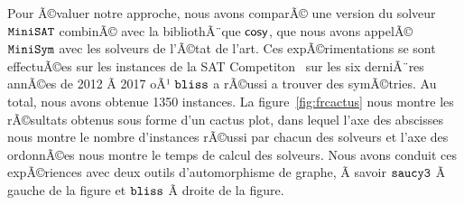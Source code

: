 Pour Ã©valuer notre approche, nous avons comparÃ© une version du solveur $\texttt{MiniSAT}$ combinÃ© avec la bibliothÃ¨que $\textsf{cosy}$, que nous avons appelÃ© $\texttt{MiniSym}$ avec les solveurs de l'Ã©tat de l'art.
Ces expÃ©rimentations se sont effectuÃ©es sur les instances de la SAT Competiton~\cite{jarvisalo2012international} sur les six derniÃ¨res annÃ©es de 2012 Ã  2017 oÃ¹ $\texttt{bliss}$ a rÃ©ussi a trouver des symÃ©tries. Au total, nous avons obtenue 1350 instances.
La figure~\ref{fig:frcactus} nous montre les rÃ©sultats obtenus sous forme d'un cactus plot, 
dans lequel l'axe des abscisses nous montre le nombre d'instances rÃ©ussi par chacun des solveurs et l'axe des ordonnÃ©es nous montre le temps de calcul des solveurs.
Nous avons conduit ces expÃ©riences avec deux outils d'automorphisme de graphe, Ã  savoir 
 $\texttt{saucy3}$ Ã  gauche de la figure et $\texttt{bliss}$ Ã  droite de la figure. 
 
